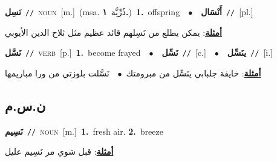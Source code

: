 \documentclass[10pt,a4paper,twoside]{article} %
\begin{document}
\begin{multicols}{2}
{\setlength\topsep{0pt}\textbf{\foreignlanguage{arabic}{نَسِل}}\ {\color{gray}\texttt{//}\color{black}}\ \textsc{noun}\ [m.]\ \color{gray}(msa. \foreignlanguage{arabic}{ذُرِّيَّة}~\foreignlanguage{arabic}{\textbf{١.}})\color{black}\ \textbf{1.}~offspring\ \ $\bullet$\ \ \setlength\topsep{0pt}\textbf{\foreignlanguage{arabic}{أَنْسَال}}\ {\color{gray}\texttt{//}\color{black}}\ [pl.]\  \begin{flushright}\color{gray}\foreignlanguage{arabic}{\textbf{\underline{\foreignlanguage{arabic}{أمثلة}}}: يمكن يطلع من نَسِلهم قائد عظيم مثل ثلاح الدين الأيوبي}\end{flushright}\color{black}} \vspace{2mm}

{\setlength\topsep{0pt}\textbf{\foreignlanguage{arabic}{نَسَّل}}\ {\color{gray}\texttt{//}\color{black}}\ \textsc{verb}\ [p.]\ \textbf{1.}~become frayed\ \ $\bullet$\ \ \setlength\topsep{0pt}\textbf{\foreignlanguage{arabic}{نَسِّل}}\ {\color{gray}\texttt{//}\color{black}}\ [c.]\ \ $\bullet$\ \ \setlength\topsep{0pt}\textbf{\foreignlanguage{arabic}{ينَسِّل}}\ {\color{gray}\texttt{//}\color{black}}\ [i.]\  \begin{flushright}\color{gray}\foreignlanguage{arabic}{\textbf{\underline{\foreignlanguage{arabic}{أمثلة}}}: خايفة جلبابي ينَسِّل من مبرومتك\ $\bullet$\ \  نَسَّلت بلوزتي من ورا مباريمها}\end{flushright}\color{black}} \vspace{2mm}

\vspace{-3mm}
\subsection*{\color{blue}\foreignlanguage{arabic}{ن.س.م}\color{blue}{}} 

{\setlength\topsep{0pt}\textbf{\foreignlanguage{arabic}{نَسِيم}}\ {\color{gray}\texttt{//}\color{black}}\ \textsc{noun}\ [m.]\ \textbf{1.}~fresh air.  \textbf{2.}~breeze\  \begin{flushright}\color{gray}\foreignlanguage{arabic}{\textbf{\underline{\foreignlanguage{arabic}{أمثلة}}}: قبل شوي مر نَسِيم عليل}\end{flushright}\color{black}} \vspace{2mm}


\end{multicols}
\end{document}
